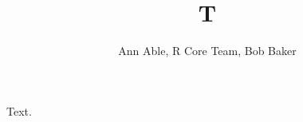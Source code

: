 \documentclass{article}
\begin{document}
\title{T}
\author{Ann Able, R Core Team, Bob Baker}
\maketitle
Text.
\end{document}
